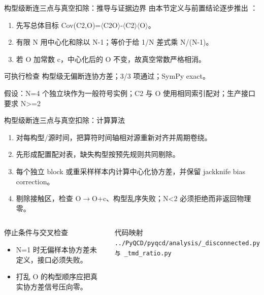 \begin{frame}[t]{构型级断连三点与真空扣除：推导与证据边界}
\footnotesize
{}\quad 由本节定义与前置结论逐步推出 ：
\begin{enumerate}
\item 先写总体目标 Cov(C2,O)=\ensuremath{\langle}C2O\ensuremath{\rangle}-\ensuremath{\langle}C2\ensuremath{\rangle}\ensuremath{\langle}O\ensuremath{\rangle}。
\item 有限 N 用中心化和除以 N-1；等价于给 1/\allowbreak{}N 差式乘 N/\allowbreak{}(N-1)。
\item 若 O 加常数 c，中心化后的 O 不变，故真空常数严格相消。
\end{enumerate}\begin{block}{可执行检查}
\quad 构型级无偏断连协方差；3/3 项通过；SymPy exact。
\par\scriptsize 假设：N=4 个独立块作为一般符号实例；C2 与 O 使用相同索引配对；生产接口要求 N>=2
\end{block}
\end{frame}

\begin{frame}[t]{构型级断连三点与真空扣除：计算算法}
\footnotesize
{}\begin{enumerate}
\item 对每构型/\allowbreak{}源时间，把算符时间轴相对源重新对齐并周期卷绕。
\item 先形成配置配对表，缺失构型按预先规则共同剔除。
\item 每个独立 block 或重采样样本内计算中心化协方差，并保留 jackknife bias correction。
\item 剔除接触区，检查 O\ensuremath{\rightarrow}O+c、构型乱序失败；N<2 必须拒绝而非返回物理零。
\end{enumerate}\begin{columns}[T,onlytextwidth]
\begin{block}{停止条件与交叉检查}\scriptsize\begin{itemize}
\item[\CheckMark] N=1 时无偏样本协方差未定义，接口必须失败。
\item[\CheckMark] 打乱 O 的构型顺序应把真实协方差信号压向零。
\end{itemize}\end{block}
\begin{block}{代码映射}
\scriptsize \texttt{.\allowbreak{}.\allowbreak{}/\allowbreak{}PyQCD/\allowbreak{}pyqcd/\allowbreak{}analysis/\allowbreak{}\_\allowbreak{}disconnected.\allowbreak{}py 与 \_\allowbreak{}tmd\_\allowbreak{}ratio.\allowbreak{}py}
\end{block}\end{columns}\end{frame}

